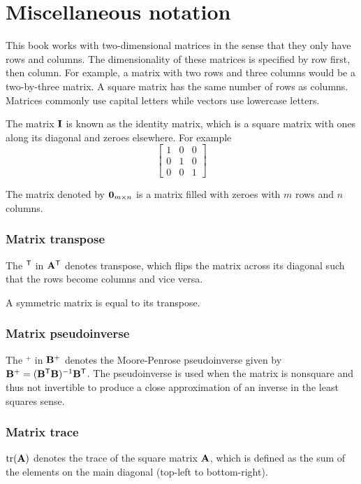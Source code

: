 \section{Miscellaneous notation}

This book works with two-dimensional matrices in the sense that they only have
rows and columns. The dimensionality of these matrices is specified by row
first, then column. For example, a matrix with two rows and three columns would
be a two-by-three matrix. A square matrix has the same number of rows as
columns. Matrices commonly use capital letters while vectors use lowercase
letters.

The matrix $\mathbf{I}$ is known as the identity matrix, which is a square matrix
with ones along its diagonal and zeroes elsewhere. For example
\begin{equation*}
  \begin{bmatrix}
    1 & 0 & 0 \\
    0 & 1 & 0 \\
    0 & 0 & 1
  \end{bmatrix}
\end{equation*}

The matrix denoted by $\mathbf{0}_{m \times n}$ is a matrix filled with zeroes with
$m$ rows and $n$ columns.

\subsubsection{Matrix transpose}
The $^\mathsf{T}$ in $\mathbf{A}^\mathsf{T}$ denotes transpose, which flips the matrix across its
diagonal such that the rows become columns and vice versa.

A symmetric matrix is equal to its transpose.

\subsubsection{Matrix pseudoinverse}
The $^+$ in $\mathbf{B}^+$ denotes the Moore-Penrose pseudoinverse given by
$\mathbf{B}^+ = (\mathbf{B}^\mathsf{T}\mathbf{B})^{-1}\mathbf{B}^\mathsf{T}$. The pseudoinverse is used when
the matrix is nonsquare and thus not invertible to produce a close approximation
of an inverse in the least squares sense.

\subsubsection{Matrix trace}
$\operatorname{tr}(\mathbf{A})$ denotes the trace of the square matrix $\mathbf{A}$, which is
defined as the sum of the elements on the main diagonal (top-left to
bottom-right).

